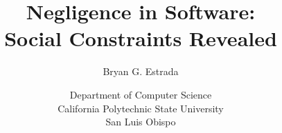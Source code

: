 \documentclass[12pt]{book}
\begin{document}

\title{Negligence in Software:\\Social Constraints Revealed}
\author{Bryan G. Estrada}
\date{Department of Computer Science\\
      California Polytechnic State University\\
      San Luis Obispo}

\begin{titlepage}
\vfill
\maketitle\thispagestyle{empty}
\vfill
\end{titlepage}

\doublespace
\tableofcontents
\newpage










\singlespace
\appendix
%

%
\doublespace




\end{document}
